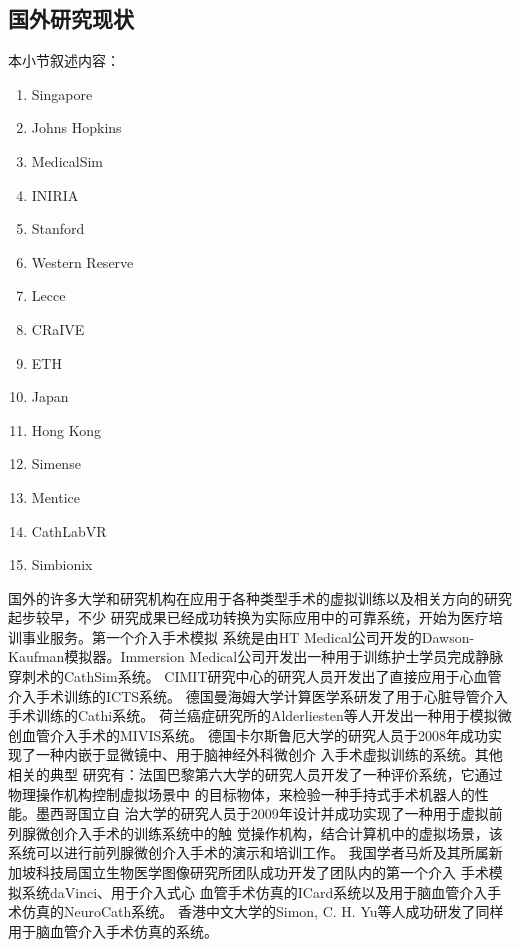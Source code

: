 \subsection{国外研究现状}

本小节叙述内容：
\begin{enumerate}
  \item Singapore
  \item Johns Hopkins
  \item MedicalSim
  \item INIRIA
  \item Stanford
  \item Western Reserve
  \item Lecce
  \item CRaIVE
  \item ETH
  \item Japan
  \item Hong Kong
  \item Simense
  \item Mentice
  \item CathLabVR
  \item Simbionix
\end{enumerate}

国外的许多大学和研究机构在应用于各种类型手术的虚拟训练以及相关方向的研究起步较早，不少
研究成果已经成功转换为实际应用中的可靠系统，开始为医疗培训事业服务。第一个介入手术模拟
系统是由HT Medical公司开发的Dawson-Kaufman模拟器\cite{meglan1996making}。Immersion
Medical公司开发出一种用于训练护士学员完成静脉穿刺术的CathSim系统\cite{ursino1999cathsim}。
CIMIT研究中心的研究人员开发出了直接应用于心血管介入手术训练的ICTS系统\cite{cotin2000icts}。
德国曼海姆大学计算医学系研发了用于心脏导管介入手术训练的Cathi系统\cite{hofer2002cathi}。
荷兰癌症研究所的Alderliesten等人开发出一种用于模拟微创血管介入手术的MIVIS系统\cite{alderliesten2004simulation}。
德国卡尔斯鲁厄大学的研究人员于2008年成功实现了一种内嵌于显微镜中、用于脑神经外科微创介
入手术虚拟训练的系统\cite{mauro2008development}\cite{mauro2009virtual}。其他相关的典型
研究有：法国巴黎第六大学的研究人员开发了一种评价系统，它通过物理操作机构控制虚拟场景中
的目标物体，来检验一种手持式手术机器人的性能\cite{zahraee2009evaluating}。墨西哥国立自
治大学的研究人员于2009年设计并成功实现了一种用于虚拟前列腺微创介入手术的训练系统中的触
觉操作机构，结合计算机中的虚拟场景，该系统可以进行前列腺微创介入手术的演示和培训工作\cite{padilla2009virtual}。
我国学者马炘及其所属新加坡科技局国立生物医学图像研究所团队成功开发了团队内的第一个介入
手术模拟系统daVinci\cite{wang1996potential}\cite{chui1996potential}、用于介入式心
血管手术仿真的ICard系统\cite{wang1999realtime}\cite{chui1998icard}以及用于脑血管介入手
术仿真的NeuroCath系统\cite{anderson2001pc}\cite{chui2002training}\cite{ma2004computer}\cite{ma2006customable}。
香港中文大学的Simon, C. H. Yu等人成功研发了同样用于脑血管介入手术仿真的系统\cite{cuhkweb}。

